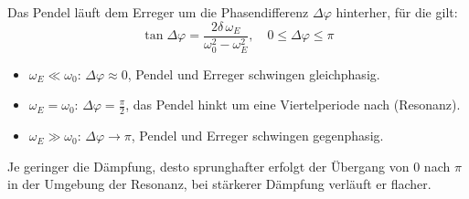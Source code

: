 \documentclass[
  headings=optiontotocandhead,
  twoside,
  openright,
  numbers=noenddot,
  toc=flat,
  11pt,
  parskip=full,
  listof=flat,
  bibliography=totoc,
  a4paper,
  DIV=14,
  BCOR=22mm,
  headheight=5mm,
  headinclude=true,
]{scrartcl}
\begin{document}
Das Pendel läuft dem Erreger um die Phasendifferenz $\Delta \varphi$ hinterher, für die gilt:
$$ \tan\Delta\varphi = \frac{2\delta\,\omega_E}{\omega_0^2 - \omega_E^2}, \quad 0 \le \Delta \varphi \le \pi $$
\begin{itemize}
  \item $\omega_E \ll \omega_0$: $\Delta \varphi \approx 0$, Pendel und Erreger schwingen gleichphasig.
  \item $\omega_E = \omega_0$: $\Delta \varphi = \frac{\pi}{2}$, das Pendel hinkt um eine Viertelperiode nach (Resonanz).
  \item $\omega_E \gg \omega_0$: $\Delta \varphi \to \pi$, Pendel und Erreger schwingen gegenphasig.
\end{itemize}
Je geringer die Dämpfung, desto sprunghafter erfolgt der Übergang von $0$ nach $\pi$ in der Umgebung der Resonanz, bei stärkerer Dämpfung verläuft er flacher.
\end{document}
